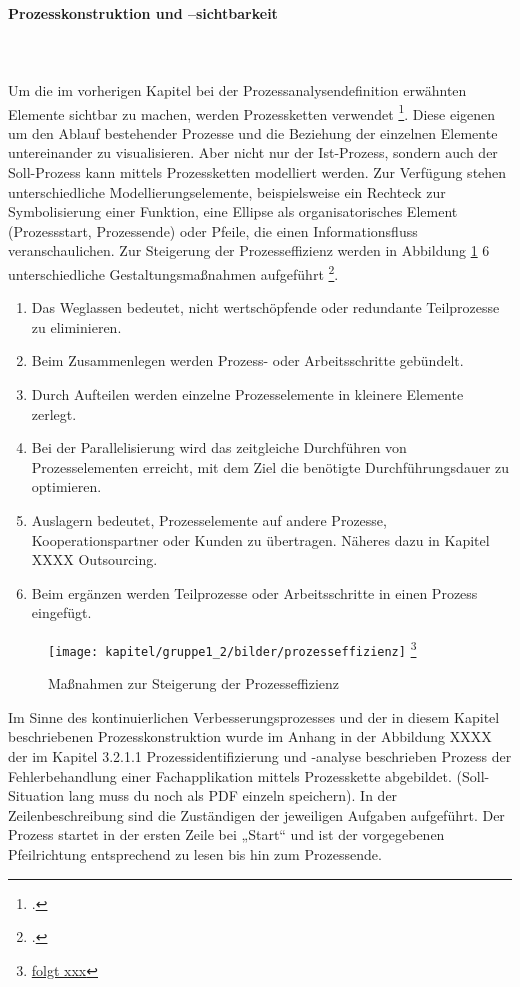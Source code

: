 \paragraph{Prozesskonstruktion und –sichtbarkeit}\mbox{}\\\\
Um die im vorherigen Kapitel bei der Prozessanalysendefinition erwähnten Elemente sichtbar zu machen, werden Prozessketten verwendet \footcite{Zitat fehlt}. Diese eigenen um den Ablauf bestehender Prozesse und die Beziehung der einzelnen Elemente untereinander zu visualisieren. Aber nicht nur der Ist-Prozess, sondern auch der Soll-Prozess kann mittels Prozessketten modelliert werden. Zur Verfügung stehen unterschiedliche Modellierungselemente, beispielsweise ein Rechteck zur Symbolisierung einer Funktion, eine Ellipse als organisatorisches Element (Prozessstart, Prozessende) oder Pfeile, die einen Informationsfluss veranschaulichen.
Zur Steigerung der Prozesseffizienz werden in Abbildung \ref{fig_massnahmen_prozesseffizienz}  6 unterschiedliche Gestaltungsmaßnahmen aufgeführt \footcite{Zitat fehlt}. 
\begin{enumerate}
    \item Das Weglassen bedeutet, nicht wertschöpfende oder redundante Teilprozesse zu eliminieren.
    \item Beim Zusammenlegen werden Prozess- oder Arbeitsschritte gebündelt.  
    \item Durch Aufteilen werden einzelne Prozesselemente in kleinere Elemente zerlegt. 
    \item Bei der Parallelisierung wird das zeitgleiche Durchführen von Prozesselementen erreicht, mit dem Ziel die benötigte Durchführungsdauer zu optimieren. 
    \item Auslagern bedeutet, Prozesselemente auf andere Prozesse, Kooperationspartner oder Kunden zu übertragen. Näheres dazu in Kapitel XXXX Outsourcing. 
    \item Beim ergänzen werden Teilprozesse oder Arbeitsschritte in einen Prozess eingefügt.
\end{enumerate}


\begin{figure}[h!]
	\centering
	\texttt{[image: kapitel/gruppe1\_2/bilder/prozesseffizienz]}
	\footnote{\url{folgt xxx}}
	\caption{Maßnahmen zur Steigerung der Prozesseffizienz}
	\label{fig_massnahmen_prozesseffizienz}
\end{figure}


Im Sinne des kontinuierlichen Verbesserungsprozesses und der in diesem Kapitel beschriebenen Prozesskonstruktion wurde im Anhang in der Abbildung XXXX der im Kapitel 3.2.1.1 Prozessidentifizierung und -analyse beschrieben Prozess der Fehlerbehandlung einer Fachapplikation mittels Prozesskette abgebildet. (Soll-Situation lang muss du noch als PDF einzeln speichern). In der Zeilenbeschreibung sind die Zuständigen der jeweiligen Aufgaben aufgeführt. Der Prozess startet in der ersten Zeile bei „Start“ und ist der vorgegebenen Pfeilrichtung entsprechend zu lesen bis hin zum Prozessende.

